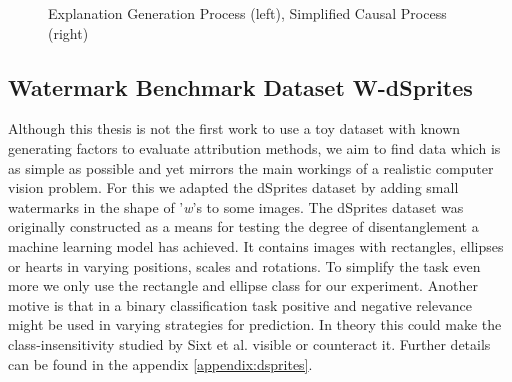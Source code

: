 \begin{figure}[H]
    \centering
    \caption{Explanation Generation Process (left), Simplified Causal Process (right)}
    \label{fig:test_tikz}
\end{figure}

\subsection{Watermark Benchmark Dataset W-dSprites}\label{section:causal_model}
Although this thesis is not the first work to use a toy dataset with known generating factors to evaluate attribution methods, we aim to find data which is as simple as possible and yet mirrors the main workings of a realistic computer vision problem.  For this we adapted the dSprites dataset \cite{dsprites17} by adding small watermarks in the shape of '\textit{w}'s to some images. The dSprites dataset was originally constructed as a means for testing the degree of disentanglement a machine learning model has achieved. It contains images with rectangles, ellipses or hearts in varying positions, scales and rotations. To simplify the task even more we only use the rectangle and ellipse class for our experiment. Another motive is that in a binary classification task positive and negative relevance might be used in varying strategies for prediction. In theory this could make the class-insensitivity studied by Sixt et al. \cite{Sixt2020} visible or counteract it. Further details can be found in the appendix \cref{appendix:dsprites}.

